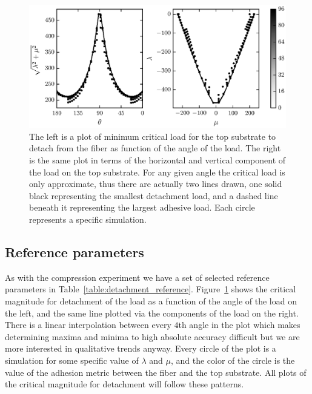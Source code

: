 	\begin{figure}[t]
		\begin{center}
			\includegraphics{./fig/ch3/pull/ref/grid.eps}
		\end{center}		
		\caption{The left is a plot of minimum critical load for the top substrate to detach from the fiber as function of the angle of the load. The right is the same plot in terms of the horizontal and vertical component of the load on the top substrate. For any given angle the critical load is only approximate, thus there are actually two lines drawn, one solid black representing the smallest detachment load, and a dashed line beneath it representing the largest adhesive load. Each circle represents a specific simulation.
		\label{fig:pull:ref}}
	\end{figure}

\subsection{Reference parameters}

As with the compression experiment we have a set of selected reference parameters in Table~\ref{table:detachment_reference}. Figure~\ref{fig:pull:ref} shows the critical magnitude for detachment of the load as a function of the angle of the load on the left, and the same line plotted via the components of the load on the right. There is a linear interpolation between every $4$th angle in the plot which makes determining maxima and minima to high absolute accuracy difficult but we are more interested in qualitative trends anyway. Every circle of the plot is a simulation for some specific value of $\lambda$ and $\mu$, and the color of the circle is the value of the adhesion metric between the fiber and the top substrate. All plots of the critical magnitude for detachment will follow these patterns.

